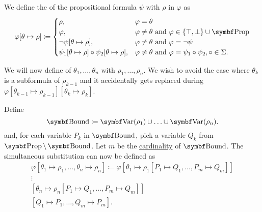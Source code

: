\begin{definition}\label{def:propositional_substition}
  \begin{DefEnum}
     We define the  of the propositional formula \( \psi \) with \( \rho \) in \( \varphi \) as
    \begin{equation}\label{eq:def:propositional_substition/single}
      \varphi[\theta \mapsto \rho] \coloneqq \begin{cases}
        \rho,                                                          &\varphi = \theta \\
        \varphi,                                                       &\varphi \neq \theta \T{and} \varphi \in \{ \top, \bot \} \cup \Bold{Prop} \\
        \neg \psi[\theta \mapsto \rho],                                &\varphi \neq \theta \T{and} \varphi = \neg \psi \\
        \psi_1[\theta \mapsto \rho] \circ \psi_2[\theta \mapsto \rho], &\varphi \neq \theta \T{and} \varphi = \psi_1 \circ \psi_2, \circ \in \Sigma.
      \end{cases}
    \end{equation}

     We will now define  of \( \theta_1, \ldots, \theta_n \) with \( \rho_1, \ldots, \rho_n \). We wish to avoid the case where \( \theta_k \) is a subformula of \( \rho_{k-1} \) and it accidentally gets replaced during \( \varphi[\theta_{k-1} \mapsto \rho_{k-1}][\theta_k \mapsto \rho_k] \).

    Define
    \begin{equation*}
      \Cat{Bound} \coloneqq \Bold{Var}(\rho_1) \cup \ldots \cup \Bold{Var}(\rho_n).
    \end{equation*}
    and, for each variable \( P_k \) in \( \Cat{Bound} \), pick a variable \( Q_k \) from \( \Bold{Prop} \setminus \Bold{Bound} \). Let \( m \) be the \hyperref[def:cardinal]{cardinality} of \( \Bold{Bound} \). The simultaneous substitution can now be defined as
    \begin{align*}
      \varphi[\theta_1 \mapsto \rho_1, \ldots, \theta_n \mapsto \rho_n] \coloneqq \varphi
      [\theta_1 \mapsto \rho_1[P_1 \mapsto Q_1, \ldots, P_m \mapsto Q_m]] \\
      \vdots \hspace{3cm} \\
      [\theta_n \mapsto \rho_n[P_1 \mapsto Q_1, \ldots, P_m \mapsto Q_m]] \\
      [Q_1 \mapsto P_1, \ldots, Q_m \mapsto P_m].
    \end{align*}
  \end{DefEnum}
\end{definition}

